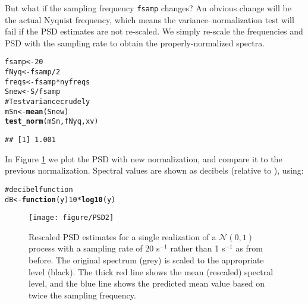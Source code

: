 \documentclass[11pt]{article}\usepackage{graphicx, color}
\makeatletter
\def\maxwidth{ %
  \ifdim\Gin@nat@width>\linewidth
    \linewidth
  \else
    \Gin@nat@width
  \fi
}
\newcommand{\hlfunctioncall}[1]{\textcolor[rgb]{0.501960784313725,0,0.329411764705882}{\textbf{#1}}}%
\newcommand{\hlcomment}[1]{\textcolor[rgb]{0.180392156862745,0.6,0.341176470588235}{#1}}%
\newenvironment{kframe}{%
 \def\at@end@of@kframe{}%
 \ifinner\ifhmode%
  \def\at@end@of@kframe{\end{minipage}}%
  \begin{minipage}{\columnwidth}%
 \fi\fi%
 \def\FrameCommand##1{\hskip\@totalleftmargin \hskip-\fboxsep
 \colorbox{shadecolor}{##1}\hskip-\fboxsep
     \hskip-\linewidth \hskip-\@totalleftmargin \hskip\columnwidth}%
 \MakeFramed {\advance\hsize-\width
   \@totalleftmargin\z@ \linewidth\hsize
   \@setminipage}}%
 {\par\unskip\endMakeFramed%
 \at@end@of@kframe}
\newenvironment{knitrout}{}{} %
\makeatother
\begin{document}
But what if the sampling frequency \texttt{fsamp} changes? An obvious change will be
the actual Nyquist frequency, which means the variance--normalization test will
fail if the PSD estimates are not re-scaled.  We simply re-scale the frequencies
and PSD
with the sampling rate
to obtain the properly-normalized spectra.

\begin{knitrout}
\color{fgcolor}\begin{kframe}
\begin{alltt}
fsamp <- 20
fNyq <- fsamp/2
freqs <- fsamp * nyfreqs
Snew <- S/fsamp
\hlcomment{# Test variance crudely}
mSn <- \hlfunctioncall{mean}(Snew)
\hlfunctioncall{test_norm}(mSn, fNyq, xv)
\end{alltt}
\begin{verbatim}
## [1] 1.001
\end{verbatim}
\end{kframe}
\end{knitrout}


In Figure \ref{fig:psdsamp} we
plot the PSD with new normalization, and compare it to
the previous normalization.
Spectral values are shown as
decibels (relative to ), using:

\begin{knitrout}
\color{fgcolor}\begin{kframe}
\begin{alltt}
\hlcomment{# decibel function}
dB <- \hlfunctioncall{function}(y) 10 * \hlfunctioncall{log10}(y)
\end{alltt}
\end{kframe}
\end{knitrout}

\begin{figure}[htb!]
\begin{center}
\begin{knitrout}
\color{fgcolor}
\texttt{[image: figure/PSD2]} 

\end{knitrout}

\caption{Rescaled PSD estimates for a single realization of a 
$\mathcal{N}(0,1)$ process with a sampling rate of 20 s$^{-1}$ rather
than 1 s$^{-1}$ as from before.  
The original spectrum (grey) is scaled to the appropriate level
(black).
The thick red line shows the mean (rescaled) spectral level, and the
blue line shows the predicted mean value based on twice the sampling
frequency.}
\label{fig:psdsamp}
\end{center}
\end{figure}
\end{document}
